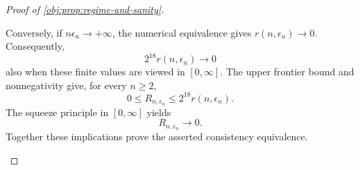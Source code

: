 \begin{proof}[Proof of \cref{obj:prop:regime-and-sanity}]
\begin{enumerate}
Conversely, if \(n\epsilon_n\to+\infty\), the numerical equivalence gives
\(r(n,\epsilon_n)\to0\). Consequently,
\[
2^{18}r(n,\epsilon_n)\longrightarrow0
\]
also when these finite values are viewed in \([0,\infty]\).
The upper frontier bound and nonnegativity give, for every \(n\ge2\),
\[
0\le R_{n,\epsilon_n}\le2^{18}r(n,\epsilon_n).
\]
The squeeze principle in \([0,\infty]\) yields
\[
R_{n,\epsilon_n}\longrightarrow0.
\]
Together these implications prove the asserted consistency equivalence.
\end{enumerate}
\end{proof}

